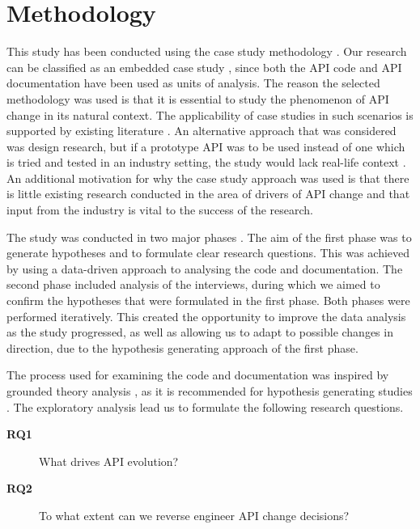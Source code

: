 \documentclass{sig-alternate}
\begin{document}
\section{Methodology} \label{methodology}
This study has been conducted using the case study methodology \cite{runeson2009guidelines}. Our research can be classified as an embedded case study \cite{yin2013case}, since both the API code and API documentation have been used as units of analysis. The reason the selected methodology was used is that it is essential to study the phenomenon of API change in its natural context. The applicability of case studies in such scenarios is supported by existing literature \cite{benbasat1987case, robson2002real, runeson2009guidelines, yin2013case}. An alternative approach that was considered was design research, but if a prototype API was to be used instead of one which is tried and tested in an industry setting, the study would lack real-life context \cite{runeson2009guidelines}. An additional motivation for why the case study approach was used is that there is little existing research conducted in the area of drivers of API change and that input from the industry is vital to the success of the research. 

The study was conducted in two major phases \cite{andersson2007spiral}. The aim of the first phase was to generate hypotheses and to formulate clear research questions. This was achieved by using a data-driven approach to analysing the code and documentation. The second phase included analysis of the interviews, during which we aimed to confirm the hypotheses that were formulated in the first phase. Both phases were performed iteratively. This created the opportunity to improve the data analysis as the study progressed, as well as allowing us to adapt to possible changes in direction, due to the hypothesis generating approach of the first phase. 

The process used for examining the code and documentation was inspired by grounded theory analysis \cite{seaman1999qualitative}, as it is recommended for hypothesis generating studies \cite{runeson2009guidelines, seaman1999qualitative}. The exploratory analysis lead us to formulate the following research questions. 


\begin{description}
\item[\textbf{RQ1}] What drives API evolution?
\item[\textbf{RQ2}] To what extent can we reverse engineer API change decisions?
\end{description}
\end{document}
